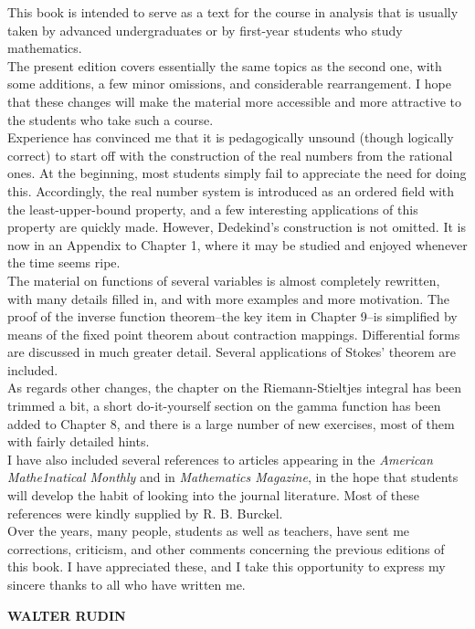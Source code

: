 %
%
\preface


This book is intended to serve as a text for the course in analysis that is usually taken by advanced 
undergraduates or by first-year students who study mathematics.\\
\indent The present edition covers essentially the same topics as the second one,
with some additions, a few minor omissions, and considerable rearrangement. I hope that these changes will 
make the material more accessible and more attractive to the students who take such a course.\\
\indent Experience has convinced me that it is pedagogically unsound (though logically correct) to start off 
with the construction of the real numbers from the rational ones. At the beginning, most students simply 
fail to appreciate the need for doing this. Accordingly, the real number system is introduced as an ordered 
field with the least-upper-bound property, and a few interesting applications of this property are quickly made. 
However, Dedekind's construction is not omitted. It is now in an Appendix to Chapter 1, where it may be 
studied and enjoyed whenever the time seems ripe.\\
\indent The material on functions of several variables is almost completely rewritten, with many details filled in, 
and with more examples and more motivation. The proof of the inverse function theorem--the key item in Chapter 9--is
simplified by means of the fixed point theorem about contraction mappings. Differential forms are discussed 
in much greater detail. Several applications of Stokes' theorem are included.\\
\indent As regards other changes, the chapter on the Riemann-Stieltjes integral has been trimmed a bit, a short 
do-it-yourself section on the gamma function has been added to Chapter 8, and there is a large number of new exercises, 
most of them with fairly detailed hints.\\
\indent I have also included several references to articles appearing in the \textit{American Mathe1natical Monthly} 
and in \textit{Mathematics Magazine}, in the hope that students will develop the habit of looking into the 
journal literature. Most of these references were kindly supplied by R. B. Burckel.\\
\indent Over the years, many people, students as well as teachers, have sent me corrections, criticism, and 
other comments concerning the previous editions of this book. I have appreciated these, and I take this 
opportunity to express my sincere thanks to all who have written me.
\vspace{\baselineskip}
\begin{flushright}\noindent
\hfill {\bf WALTER RUDIN}\\
\end{flushright}
